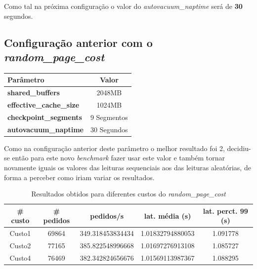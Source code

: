 Como tal na próxima configuração o valor do \textit{autovacuum\_naptime} será de \textbf{30} segundos.

\newpage

\subsection{Configuração anterior com o \textit{random\_page\_cost}}

\begin{table}[!h]
\center
\small
\begin{tabular}{|l|c|}
\hline
\textbf{Parâmetro} & \textbf{Valor} \\ \hline
\textbf{shared\_buffers} & 2048MB  \\ \hline
\textbf{effective\_cache\_size} & 1024MB  \\ \hline
\textbf{checkpoint\_segments} & 9 Segmentos \\ \hline
\textbf{autovacuum\_naptime} & 30 Segundos \\ \hline
\end{tabular}
\end{table}

Como na configuração anterior deste parâmetro o melhor resultado foi 2, decidiu-se então para este novo \textit{benchmark} fazer usar este valor e também tornar novamente iguais os valores das leituras sequenciais aos das leituras aleatórias, de forma a perceber como iriam variar os resultados.

\begin{table}[!h]
\center
\small
\begin{tabular}{|c|c|c|c|c|}
\hline
\textbf{\# custo} & \textbf{\# pedidos} & \textbf{pedidos/s} & \textbf{lat. média (s)} & \textbf{lat. perct. 99 (s)}  \\ \hline
Custo1 & 69864 & 349.318453834434 & 1.01832794880053 & 1.091778  \\ \hline
Custo2 & 77165 & 385.822548996668 & 1.01697276913108 & 1.085727  \\ \hline
Custo4 & 76469 & 382.342824656676 & 1.01569113987367 & 1.088295  \\ \hline
\end{tabular}
\caption{Resultados obtidos para diferentes custos do \textit{random\_page\_cost}}
\end{table}

